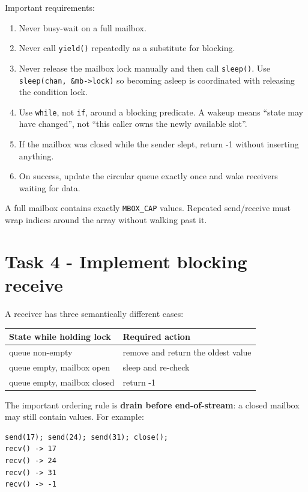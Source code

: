 \documentclass[11pt,a4paper]{article}
\newcommand{\file}[1]{\texttt{#1}}
\begin{document}
Important requirements:

\begin{enumerate}[leftmargin=7mm]
\item Never busy-wait on a full mailbox.
\item Never call \file{yield()} repeatedly as a substitute for blocking.
\item Never release the mailbox lock manually and then call \file{sleep()}. Use \file{sleep(chan, \&mb->lock)} so becoming asleep is coordinated with releasing the condition lock.
\item Use \file{while}, not \file{if}, around a blocking predicate. A wakeup means ``state may have changed'', not ``this caller owns the newly available slot''.
\item If the mailbox was closed while the sender slept, return -1 without inserting anything.
\item On success, update the circular queue exactly once and wake receivers waiting for data.
\end{enumerate}

A full mailbox contains exactly \file{MBOX\_CAP} values. Repeated send/receive must wrap indices around the array without walking past it.

\section{Task 4 - Implement blocking receive}

A receiver has three semantically different cases:

\begin{center}
\begin{tabularx}{0.92\textwidth}{@{}p{40mm}X@{}}
\toprule
\textbf{State while holding lock} & \textbf{Required action} \\
\midrule
queue non-empty & remove and return the oldest value \\
queue empty, mailbox open & sleep and re-check \\
queue empty, mailbox closed & return -1 \\
\bottomrule
\end{tabularx}
\end{center}

The important ordering rule is \textbf{drain before end-of-stream}: a closed mailbox may still contain values. For example:

\begin{lstlisting}
send(17); send(24); send(31); close();
recv() -> 17
recv() -> 24
recv() -> 31
recv() -> -1
\end{lstlisting}
\end{document}
